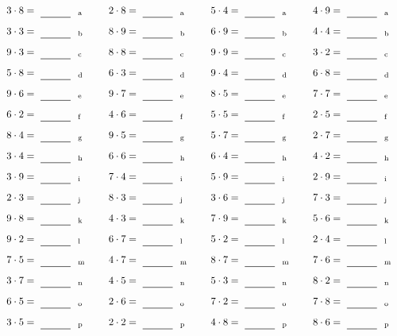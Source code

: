 \documentclass
[
  draft    = true,
  fontsize = 11pt,
  parskip  = half-
]
{scrartcl}
\begin{document}
\par\vfill\par
\begin{align*}
    \pline{3\cdot8}&=\rline{a}
  & \pline{2\cdot8}&=\rline{a}
  & \pline{5\cdot4}&=\rline{a}
  & \pline{4\cdot9}&=\rline{a} \\[1ex]
    \pline{3\cdot3}&=\rline{b}
  & \pline{8\cdot9}&=\rline{b}
  & \pline{6\cdot9}&=\rline{b}
  & \pline{4\cdot4}&=\rline{b} \\[1ex]
    \pline{9\cdot3}&=\rline{c}
  & \pline{8\cdot8}&=\rline{c}
  & \pline{9\cdot9}&=\rline{c}
  & \pline{3\cdot2}&=\rline{c} \\[1ex]
    \pline{5\cdot8}&=\rline{d}
  & \pline{6\cdot3}&=\rline{d}
  & \pline{9\cdot4}&=\rline{d}
  & \pline{6\cdot8}&=\rline{d} \\[1ex]
    \pline{9\cdot6}&=\rline{e}
  & \pline{9\cdot7}&=\rline{e}
  & \pline{8\cdot5}&=\rline{e}
  & \pline{7\cdot7}&=\rline{e} \\[1ex]
    \pline{6\cdot2}&=\rline{f}
  & \pline{4\cdot6}&=\rline{f}
  & \pline{5\cdot5}&=\rline{f}
  & \pline{2\cdot5}&=\rline{f} \\[1ex]
    \pline{8\cdot4}&=\rline{g}
  & \pline{9\cdot5}&=\rline{g}
  & \pline{5\cdot7}&=\rline{g}
  & \pline{2\cdot7}&=\rline{g} \\[1ex]
    \pline{3\cdot4}&=\rline{h}
  & \pline{6\cdot6}&=\rline{h}
  & \pline{6\cdot4}&=\rline{h}
  & \pline{4\cdot2}&=\rline{h} \\[1ex]
    \pline{3\cdot9}&=\rline{i}
  & \pline{7\cdot4}&=\rline{i}
  & \pline{5\cdot9}&=\rline{i}
  & \pline{2\cdot9}&=\rline{i} \\[1ex]
    \pline{2\cdot3}&=\rline{j}
  & \pline{8\cdot3}&=\rline{j}
  & \pline{3\cdot6}&=\rline{j}
  & \pline{7\cdot3}&=\rline{j} \\[1ex]
    \pline{9\cdot8}&=\rline{k}
  & \pline{4\cdot3}&=\rline{k}
  & \pline{7\cdot9}&=\rline{k}
  & \pline{5\cdot6}&=\rline{k} \\[1ex]
    \pline{9\cdot2}&=\rline{l}
  & \pline{6\cdot7}&=\rline{l}
  & \pline{5\cdot2}&=\rline{l}
  & \pline{2\cdot4}&=\rline{l} \\[1ex]
    \pline{7\cdot5}&=\rline{m}
  & \pline{4\cdot7}&=\rline{m}
  & \pline{8\cdot7}&=\rline{m}
  & \pline{7\cdot6}&=\rline{m} \\[1ex]
    \pline{3\cdot7}&=\rline{n}
  & \pline{4\cdot5}&=\rline{n}
  & \pline{5\cdot3}&=\rline{n}
  & \pline{8\cdot2}&=\rline{n} \\[1ex]
    \pline{6\cdot5}&=\rline{o}
  & \pline{2\cdot6}&=\rline{o}
  & \pline{7\cdot2}&=\rline{o}
  & \pline{7\cdot8}&=\rline{o} \\[1ex]
    \pline{3\cdot5}&=\rline{p}
  & \pline{2\cdot2}&=\rline{p}
  & \pline{4\cdot8}&=\rline{p}
  & \pline{8\cdot6}&=\rline{p}
\end{align*}
\end{document}
